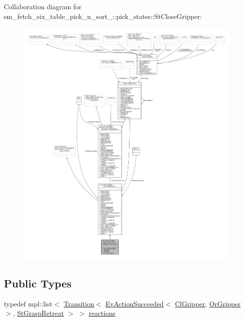 Collaboration diagram for sm\+\_\+fetch\+\_\+six\+\_\+table\+\_\+pick\+\_\+n\+\_\+sort\+\_\+:\+:pick\+\_\+states\+:\+:St\+Close\+Gripper\+:
\nopagebreak
\begin{figure}[H]
\begin{center}
\leavevmode
\includegraphics[width=350pt]{structsm__fetch__six__table__pick__n__sort__1_1_1pick__states_1_1StCloseGripper__coll__graph}
\end{center}
\end{figure}
\subsection*{Public Types}
\begin{DoxyCompactItemize}
\item 
typedef mpl\+::list$<$ \hyperlink{classsmacc_1_1Transition}{Transition}$<$ \hyperlink{structsmacc_1_1default__events_1_1EvActionSucceeded}{Ev\+Action\+Succeeded}$<$ \hyperlink{classsm__fetch__six__table__pick__n__sort__1_1_1cl__gripper_1_1ClGripper}{Cl\+Gripper}, \hyperlink{classsm__fetch__six__table__pick__n__sort__1_1_1OrGripper}{Or\+Gripper} $>$, \hyperlink{structsm__fetch__six__table__pick__n__sort__1_1_1pick__states_1_1StGraspRetreat}{St\+Grasp\+Retreat} $>$ $>$ \hyperlink{structsm__fetch__six__table__pick__n__sort__1_1_1pick__states_1_1StCloseGripper_a1e740e1c51549e2efb4bd93129449231}{reactions}
\end{DoxyCompactItemize}
